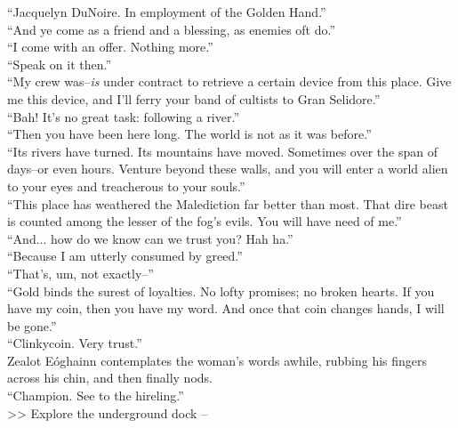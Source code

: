 “Jacquelyn DuNoire. In employment of the Golden Hand.”\\

“And ye come as a friend and a blessing, as enemies oft do.”\\

“I come with an offer. Nothing more.”\\

“Speak on it then.”\\

“My crew was--\emph{is} under contract to retrieve a certain device from this place. Give me this device, and I’ll ferry your band of cultists to Gran Selidore.”\\

“Bah! It’s no great task: following a river.”\\

“Then you have been here long. The world is not as it was before.”\\

“Its rivers have turned. Its mountains have moved. Sometimes over the span of days--or even hours. Venture beyond these walls, and you will enter a world alien to your eyes and treacherous to your souls.”\\

“This place has weathered the Malediction far better than most. That dire beast is counted among the lesser of the fog’s evils. You will have need of me.”\\

“And... how do we know can we trust you? Hah ha.”\\

“Because I am utterly consumed by greed.”\\

“That’s, um, not exactly--”\\

“Gold binds the surest of loyalties. No lofty promises; no broken hearts. If you have my coin, then you have my word. And once that coin changes hands, I will be gone.”\\

“Clinkycoin. Very trust.”\\

Zealot Eóghainn contemplates the woman’s words awhile, rubbing his fingers across his chin, and then finally nods.\\

“Champion. See to the hireling.”\\

>> Explore the underground dock -- 
